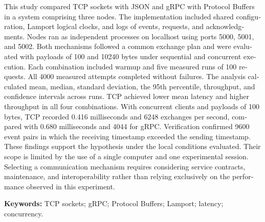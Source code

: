 \begin{minipage}[t]{\linewidth}
\begin{otherlanguage}{english}
This study compared TCP sockets with JSON and gRPC with Protocol Buffers in a
system comprising three nodes. The implementation included shared configuration, Lamport
logical clocks, and logs of events, requests, and acknowledgments. Nodes ran as
independent processes on localhost using ports 5000, 5001, and 5002. Both mechanisms
followed a common exchange plan and were evaluated with payloads of 100 and 10240
bytes under sequential and concurrent execution. Each combination included warmup
and five measured runs of 100 requests. All 4000 measured attempts completed
without failures. The analysis calculated mean, median, standard deviation, the
95th percentile, throughput, and confidence intervals across runs. TCP achieved
lower mean latency and higher throughput in all four combinations. With concurrent
clients and payloads of 100 bytes, TCP recorded 0.416 milliseconds and 6248 exchanges
per second, compared with 0.680 milliseconds and 4044 for gRPC. Verification
confirmed 9600 event pairs in which the receiving timestamp exceeded the sending
timestamp. These findings support the hypothesis under the local conditions
evaluated. Their scope is limited by the use of a single computer and one
experimental session. Selecting a communication mechanism requires considering
service contracts, maintenance, and interoperability rather than relying
exclusively on the performance observed in this experiment.

\medskip
\noindent\textbf{Keywords:} TCP sockets; gRPC; Protocol Buffers; Lamport;
latency; concurrency.
\end{otherlanguage}
\end{minipage}\par
\clearpage
